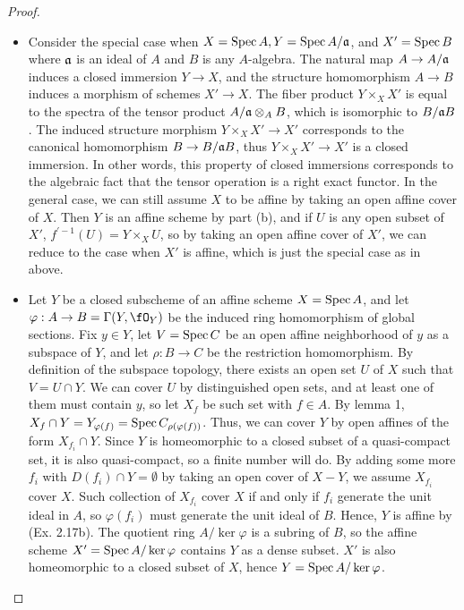 \documentclass[a4paper]{article}
\begin{document}
\begin{enumerate} [label=\textbf{\arabic*.}, leftmargin=0em]
          \begin{proof} $ $ \vspace{0pt}
              \begin{itemize} [leftmargin=0cm]
                  \item[(a)] Consider the special case when $X = \operatorname{Spec}{A}, Y = \operatorname{Spec}{A / \mathfrak{a}}$, and $X' = \operatorname{Spec}{B}$ where $\mathfrak{a}$ is an ideal of $A$ and $B$ is any $A$-algebra. The natural map $A \to A / \mathfrak{a}$ induces a closed immersion $Y \to X$, and the structure homomorphism $A \to B$ induces a morphism of schemes $X' \to X$. The fiber product $Y \times_X X'$ is equal to the spectra of the tensor product $A / \mathfrak{a} \otimes_A B$, which is isomorphic to $B / \mathfrak{a}B$. The induced structure morphism $Y \times_X X' \to X'$ corresponds to the canonical homomorphism $B \to B / \mathfrak{a} B$, thus $Y \times_X X' \to X'$ is a closed immersion. In other words, this property of closed immersions corresponds to the algebraic fact that the tensor operation is a right exact functor. In the general case, we can still assume $X$ to be affine by taking an open affine cover of $X$. Then $Y$ is an affine scheme by part (b), and if $U$ is any open subset of $X'$, $f^{'-1}(U) = Y \times_X U$, so by taking an open affine cover of $X'$, we can reduce to the case when $X'$ is affine, which is just the special case as in above.

                  \item[(b)] Let $Y$ be a closed subscheme of an affine scheme $X = \operatorname{Spec}{A}$, and let $\varphi : A \to B = \Gamma(Y, \fO_Y)$ be the induced ring homomorphism of global sections. Fix $y \in Y$, let $V = \operatorname{Spec}{C}$ be an open affine neighborhood of $y$ as a subspace of $Y$, and let $\rho : B \to C$ be the restriction homomorphism. By definition of the subspace topology, there exists an open set $U$ of $X$ such that $V = U \cap Y$. We can cover $U$ by distinguished open sets, and at least one of them must contain $y$, so let $X_f$ be such set with $f \in A$. By lemma 1, $X_f \cap Y = Y_{\varphi(f)} = \operatorname{Spec}{C_{\rho(\varphi(f))}}$. Thus, we can cover $Y$ by open affines of the form $X_{f_i} \cap Y$. Since $Y$ is homeomorphic to a closed subset of a quasi-compact set, it is also quasi-compact, so a finite number will do. By adding some more $f_i$ with $D(f_i) \cap Y = \emptyset$ by taking an open cover of $X - Y$, we assume $X_{f_i}$ cover $X$. Such collection of $X_{f_i}$ cover $X$ if and only if $f_i$ generate the unit ideal in $A$, so $\varphi(f_i)$ must generate the unit ideal of $B$. Hence, $Y$ is affine by (Ex. 2.17b). The quotient ring $A / \ker{\varphi}$ is a subring of $B$, so the affine scheme $X' = \operatorname{Spec}{A / \ker{\varphi}}$ contains $Y$ as a dense subset. $X'$ is also homeomorphic to a closed subset of $X$, hence $Y = \operatorname{Spec}{A / \ker{\varphi}}$.


\end{itemize}
\end{proof}
\end{enumerate}
\end{document}
